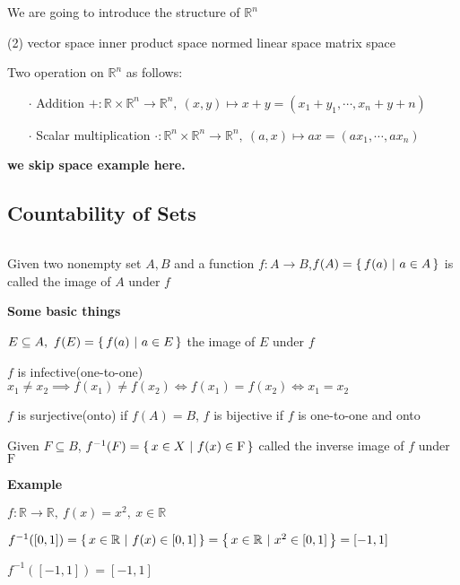 We are going to introduce the structure of $\mathbb R^n$

\begin{tasks}(2)
	\task[$\cdot$] vector space
	\task[$\cdot$] inner product space
	\task[$\cdot$] normed linear space
	\task[$\cdot$] matrix space
\end{tasks}

\begin{defn}
	Two operation on $\mathbb R^n$ as follows:
	
	\begin{enumerate}
		\item[$\cdot$] Addition $+:\mathbb R \times \mathbb R^n \rightarrow \mathbb R^n ,~(x,y) \mapsto x+y = (x_1+y_1,\cdots,x_n+y+n)$
		\item[$\cdot$] Scalar multiplication $\cdot:\mathbb R^n \times \mathbb R^n \rightarrow \mathbb R^n,~(a,x) \mapsto ax=(ax_1,\cdots,ax_n)$ 
	\end{enumerate}
\end{defn}

\textbf{\color{red} we skip space example here.}

\subsection{Countability of Sets}$ $

Given two nonempty set $A,B$ and a function $f:A \rightarrow B$,$f(A) = \left\{ \,f(a)~|~a \in A \,\right\}$ is called the image of $A$ under $f$

\textbf{Some basic things}
\begin{tcolorbox}
	$E \subseteq A,~f(E) = \left\{ \,f(a)~|~a \in E \,\right\}$ the image of $E$ under $f$
	
	$f$ is infective(one-to-one) $x_1 \neq x_2 \implies f(x_1) \neq f(x_2) \Leftrightarrow f(x_1) = f(x_2) \Leftrightarrow x_1 = x_2$
	
	$f$ is surjective(onto) if $f(A) = B$, $f$ is bijective if $f$ is one-to-one and onto
\end{tcolorbox}

Given $F \subseteq B$, $f^{-1}(F) = \left\{ \,x \in X~|~f(x) \in \mathrm F \,\right\}$ called the inverse image of $f$ under $\mathrm F$

\textbf{Example}

\begin{tcolorbox}
	$f:\mathbb R \rightarrow \mathbb R,~f(x) = x^2,~x\in \mathbb R$
	
	$f^{-1}([0,1]) = \left\{ \,x\in \mathbb R ~|~ f(x) \in [0,1] \,\right\} = \left\{ \,x \in \mathbb R ~|~ x^2 \in [0,1] \,\right\} = [-1,1]$
	
	$f^{-1}([-1,1]) = [-1,1]$
\end{tcolorbox}

